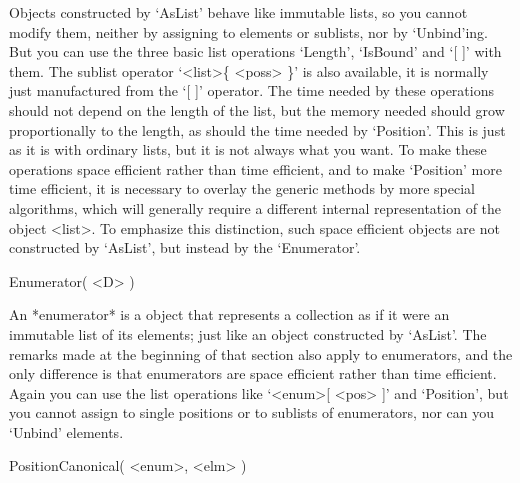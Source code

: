Objects constructed  by  `AsList'  behave like  immutable  lists,  so you
cannot modify them, neither by assigning to elements  or sublists, nor by
`Unbind'ing. But you  can use the three  basic  list operations `Length',
`IsBound' and `[ ]' with them.  The sublist operator `<list>\{ <poss> \}'
is  also  available, it  is  normally  just  manufactured from  the `[ ]'
operator. The  time needed by  these operations should  not depend on the
length of  the list, but the  memory needed should grow proportionally to
the length, as should  the time needed by `Position'.  This is just as it
is with ordinary lists, but it is not always what you want. To make these
operations  space  efficient  rather  than time  efficient,   and to make
`Position' more time  efficient, it is necessary  to  overlay the generic
methods by   more  special algorithms, which   will  generally  require a
different internal representation of the object <list>. To emphasize this
distinction,  such space   efficient    objects are not  constructed   by
`AsList', but instead by the `Enumerator'.

\>Enumerator( <D> )

An *enumerator* is a {\GAP} object that represents a  collection as if it
were an immutable list  of its elements;  just like an object constructed
by `AsList'. The remarks made at the beginning of that section also apply
to enumerators, and the   only difference is  that enumerators  are space
efficient   rather   than time  efficient. Again   you   can use the list
operations  like `<enum>[ <pos> ]'  and `Position', but you cannot assign
to single positions  or to sublists of enumerators,  nor can you `Unbind'
elements.

\>PositionCanonical( <enum>, <elm> )

